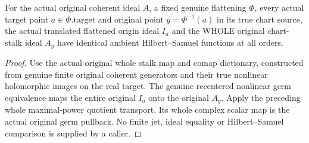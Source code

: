 \begin{theorem}
\label{hir:smooth-centre-fixed-real-original-ambient-hs-dictionary}
\leanok
For the actual original coherent ideal $A$, a fixed genuine flattening
$\Phi$, every actual target point $a\in\Phi.\mathrm{target}$ and original
point $y=\Phi^{-1}(a)$ in its true chart source, the actual translated
flattened origin ideal $I_a$ and the WHOLE original chart-stalk ideal
$A_y$ have identical ambient Hilbert--Samuel functions at all orders.
\end{theorem}
\begin{proof}
Use the actual original whole stalk map and comap dictionary, constructed
from genuine finite original coherent generators and their true nonlinear
holomorphic images on the real target. The genuine recentered nonlinear
germ equivalence maps the entire original $I_a$ onto the original $A_y$.
Apply the preceding whole maximal-power quotient transport. Its whole
complex scalar map is the actual original germ pullback. No finite jet,
ideal equality or Hilbert--Samuel comparison is supplied by a caller.
\end{proof}
